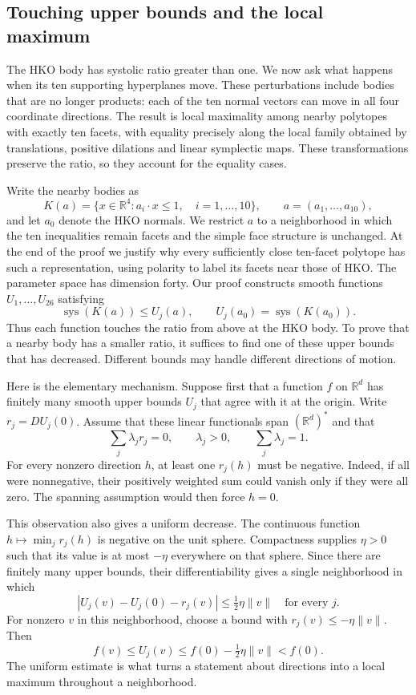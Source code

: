 \subsection*{Touching upper bounds and the local maximum}

The HKO body has systolic ratio greater than one. We now ask what happens
when its ten supporting hyperplanes move. These perturbations include bodies
that are no longer products: each of the ten normal vectors can move in all
four coordinate directions. The result is local maximality among nearby
polytopes with exactly ten facets, with equality precisely along the local
family obtained by translations, positive dilations and linear symplectic
maps. These transformations preserve the ratio, so they account for the
equality cases.

Write the nearby bodies as
\[
 K(a)=\{x\in\mathbb R^4:a_i\cdot x\leq1,\quad i=1,\ldots,10\},
 \qquad a=(a_1,\ldots,a_{10}),
\]
and let $a_0$ denote the HKO normals. We restrict $a$ to a neighborhood in
which the ten inequalities remain facets and the simple face structure is
unchanged. At the end of the proof we justify why every sufficiently close
ten-facet polytope has such a representation, using polarity to label its
facets near those of HKO. The parameter space has dimension forty. Our proof constructs
smooth functions $U_1,\ldots,U_{26}$ satisfying
\[
 \operatorname{sys}(K(a))\leq U_j(a),\qquad
 U_j(a_0)=\operatorname{sys}(K(a_0)).
\]
Thus each function touches the ratio from above at the HKO body. To prove
that a nearby body has a smaller ratio, it suffices to find one of these
upper bounds that has decreased. Different bounds may handle different
directions of motion.

Here is the elementary mechanism. Suppose first that a function $f$ on
$\mathbb R^d$ has finitely many smooth upper bounds $U_j$ that agree with it
at the origin. Write $r_j=DU_j(0)$. Assume that these linear functionals span
$(\mathbb R^d)^*$ and that
\[
 \sum_j\lambda_j r_j=0,\qquad
 \lambda_j>0,\qquad \sum_j\lambda_j=1.
\]
For every nonzero direction $h$, at least one $r_j(h)$ must be negative.
Indeed, if all were nonnegative, their positively weighted sum could vanish
only if they were all zero. The spanning assumption would then force $h=0$.

This observation also gives a uniform decrease. The continuous function
$h\mapsto\min_j r_j(h)$ is negative on the unit sphere. Compactness supplies
$\eta>0$ such that its value is at most $-\eta$ everywhere on that sphere.
Since there are finitely many upper bounds, their differentiability gives a
single neighborhood in which
\[
 |U_j(v)-U_j(0)-r_j(v)|\leq\tfrac12\eta\|v\|
 \quad\text{for every }j.
\]
For nonzero $v$ in this neighborhood, choose a bound with
$r_j(v)\leq-\eta\|v\|$. Then
\[
 f(v)\leq U_j(v)\leq f(0)-\tfrac12\eta\|v\|<f(0).
\]
The uniform estimate is what turns a statement about directions into a
local maximum throughout a neighborhood.

